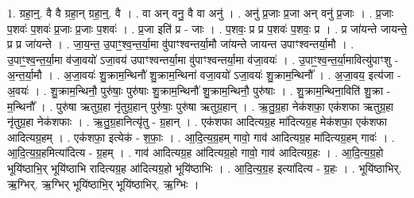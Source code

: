 \documentclass[17pt]{extarticle}
\begin{document}
1. ग्रहा॒न्॒. वै वै ग्रहा॒न् ग्रहा॒न्॒. वै । . वा अन् वनु॒ वै वा अनु॑ । . अनु॑ प्र॒जाः प्र॒जा अन् वनु॑ प्र॒जाः । . प्र॒जाः प॒शवः॑ प॒शवः॑ प्र॒जाः प्र॒जाः प॒शवः॑ । . प्र॒जा इति॑ प्र - जाः । . प॒शवः॒ प्र प्र प॒शवः॑ प॒शवः॒ प्र । . प्र जा॑यन्ते जायन्ते॒ प्र प्र जा॑यन्ते । . जा॒य॒न्त॒ उ॒पाꣳ॒॒श्व॒न्त॒र्या॒मा वु॑पाꣳश्वन्तर्या॒मौ जा॑यन्ते जायन्त उपाꣳश्वन्तर्या॒मौ । . उ॒पाꣳ॒॒श्व॒न्त॒र्या॒मा व॑जा॒वयो॑ ऽजा॒वय॑ उपाꣳश्वन्तर्या॒मा वु॑पाꣳश्वन्तर्या॒मा व॑जा॒वयः॑ । . उ॒पाꣳ॒॒श्व॒न्त॒र्या॒मावित्यु॑पाꣳशु - अ॒न्त॒र्या॒मौ । . अ॒जा॒वयः॑ शु॒क्राम॒न्थिनौ॑ शु॒क्राम॒न्थिना॑ वजा॒वयो॑ ऽजा॒वयः॑ शु॒क्राम॒न्थिनौ᳚ । . अ॒जा॒वय॒ इत्य॑जा - अ॒वयः॑ । . शु॒क्राम॒न्थिनौ॒ पुरु॑षाः॒ पुरु॑षाः शु॒क्राम॒न्थिनौ॑ शु॒क्राम॒न्थिनौ॒ पुरु॑षाः । . शु॒क्राम॒न्थिना॒विति॑ शु॒क्रा - म॒न्थिनौ᳚ । . पुरु॑षा ऋतुग्र॒हा नृ॑तुग्र॒हान् पुरु॑षाः॒ पुरु॑षा ऋतुग्र॒हान् । . ऋ॒तु॒ग्र॒हा नेक॑शफा॒ एक॑शफा ऋतुग्र॒हा नृ॑तुग्र॒हा नेक॑शफाः । . ऋ॒तु॒ग्र॒हानित्यृ॑तु - ग्र॒हान् । . एक॑शफा आदित्यग्र॒ह मा॑दित्यग्र॒ह मेक॑शफा॒ एक॑शफा आदित्यग्र॒हम् । . एक॑शफा॒ इत्येक॑ - श॒फाः॒ । . आ॒दि॒त्य॒ग्र॒हम् गावो॒ गाव॑ आदित्यग्र॒ह मा॑दित्यग्र॒हम् गावः॑ । . आ॒दि॒त्य॒ग्र॒हमित्या॑दित्य - ग्र॒हम् । . गाव॑ आदित्यग्र॒ह आ॑दित्यग्र॒हो गावो॒ गाव॑ आदित्यग्र॒हः । . आ॒दि॒त्य॒ग्र॒हो भूयि॑ष्ठाभि॒र् भूयि॑ष्ठाभि रादित्यग्र॒ह आ॑दित्यग्र॒हो भूयि॑ष्ठाभिः । . आ॒दि॒त्य॒ग्र॒ह इत्या॑दित्य - ग्र॒हः । . भूयि॑ष्ठाभिर्. ऋ॒ग्भिर्. ऋ॒ग्भिर् भूयि॑ष्ठाभि॒र् भूयि॑ष्ठाभिर्. ऋ॒ग्भिः । \newline
\end{document}
